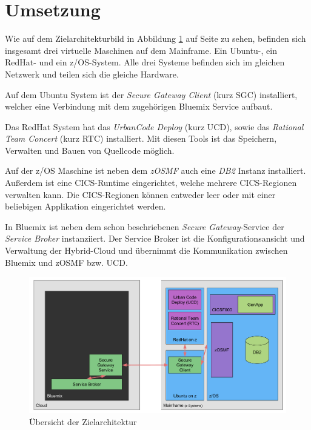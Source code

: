 \section{Umsetzung}
Wie auf dem Zielarchitekturbild in Abbildung \ref{fig:architektur_gesamt} auf Seite \pageref{fig:architektur_gesamt}
zu sehen, befinden sich insgesamt drei virtuelle Maschinen auf dem Mainframe. Ein Ubuntu-, ein RedHat- und ein
z/OS-System. Alle drei Systeme befinden sich im gleichen Netzwerk und teilen sich die gleiche Hardware.

Auf dem Ubuntu System ist der \textit{Secure Gateway Client} (kurz SGC) installiert, welcher eine Verbindung mit dem
zugehörigen Bluemix Service aufbaut.

Das RedHat System hat das \textit{UrbanCode Deploy} (kurz UCD), sowie das \textit{Rational Team Concert} (kurz RTC)
installiert. Mit diesen Tools ist das Speichern, Verwalten und Bauen von Quellcode möglich.

Auf der z/OS Maschine ist neben dem \textit{zOSMF} auch eine \textit{DB2} Instanz installiert. Außerdem ist eine
CICS-Runtime eingerichtet, welche mehrere CICS-Regionen verwalten kann. Die CICS-Regionen können entweder leer oder mit
einer beliebigen Applikation eingerichtet werden.

In Bluemix ist neben dem schon beschriebenen \textit{Secure Gateway}-Service der \textit{Service Broker} instanziiert.
Der Service Broker ist die Konfigurationsansicht und Verwaltung der Hybrid-Cloud und übernimmt die Kommunikation zwischen
Bluemix und zOSMF bzw. UCD.


\begin{figure}[h]
  \centering
    \includegraphics[scale=0.48]{images/kapitel_3/architektur_gesamt.pdf}
  \caption{Übersicht der Zielarchitektur}
  \label{fig:architektur_gesamt}
\end{figure}


